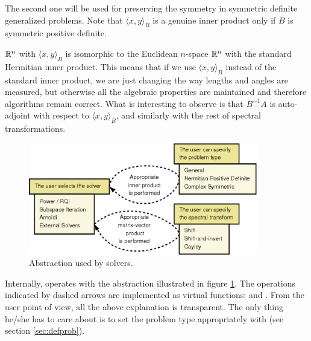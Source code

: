 	The second one will be used for preserving the symmetry in symmetric definite generalized problems. Note that $\langle x,y\rangle_B$ is a genuine inner product only if $B$ is symmetric positive definite. 

	$\mathbb{R}^n$ with $\langle x,y\rangle_B$ is isomorphic to the Euclidean $n$-space $\mathbb{R}^n$ with the standard Hermitian inner product. This means that if we use $\langle x,y\rangle_B$ instead of the standard inner product, we are just changing the way lengths and angles are measured, but otherwise all the algebraic properties are maintained and therefore algorithms remain correct. What is interesting to observe is that $B^{-1}\!A$ is auto-adjoint with respect to $\langle x,y\rangle_B$, and similarly with the rest of spectral transformations.

\begin{figure}[t]
  \begin{center}
    \includegraphics[width=10cm]{solvers}
  \end{center}
\caption{\label{fig:abstr}Abstraction used by \slepc solvers.}
\end{figure}

	Internally, \slepc operates with the abstraction illustrated in figure \ref{fig:abstr}. The operations indicated by dashed arrows are implemented as virtual functions:  and . From the user point of view, all the above explanation is transparent. The only thing he/she has to care about is to set the problem type appropriately with  (see section \ref{sec:defprob}).



